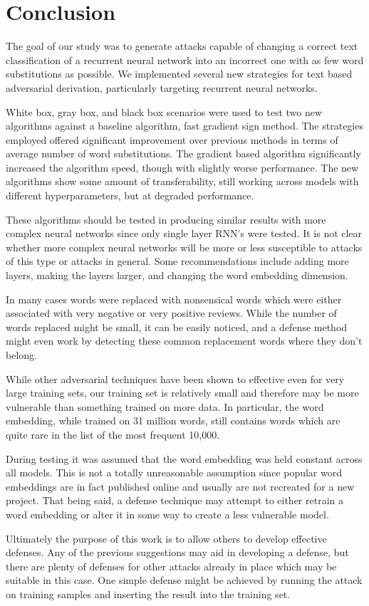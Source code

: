 \chapter{Conclusion}
The goal of our study was to generate attacks capable of changing a correct text classification of a recurrent neural network into an incorrect one with as few word substitutions as possible.  We implemented several new strategies for text based adversarial derivation, particularly targeting recurrent neural networks.  

White box, gray box, and black box scenarios were used to test two new algorithms against a baseline algorithm, fast gradient sign method.  The strategies employed offered significant improvement over previous methods in terms of average number of word substitutions.  The gradient based algorithm significantly increased the algorithm speed, though with slightly worse performance.  The new algorithms show some amount of transferability, still working across models with different hyperparameters, but at degraded performance.  

These algorithms should be tested in producing similar results with more complex neural networks since only single layer RNN's were tested.  It is not clear whether more complex neural networks will be more or less susceptible to attacks of this type or attacks in general.  Some recommendations include adding more layers, making the layers larger, and changing the word embedding dimension.

In many cases words were replaced with nonsensical words which were either associated with very negative or very positive reviews.  While the number of words replaced might be small, it can be easily noticed, and a defense method might even work by detecting these common replacement words where they don't belong.

While other adversarial techniques have been shown to effective even for very large training sets, our training set is relatively small and therefore may be more vulnerable than something trained on more data.  In particular, the word embedding, while trained on 31 million words, still contains words which are quite rare in the list of the most frequent 10,000.

During testing it was assumed that the word embedding was held constant across all models.  This is not a totally unreasonable assumption since popular word embeddings are in fact published online and usually are not recreated for a new project.  That being said, a defense technique may attempt to either retrain a word embedding or alter it in some way to create a less vulnerable model.

Ultimately the purpose of this work is to allow others to develop effective defenses.  Any of the previous suggestions may aid in developing a defense, but there are plenty of defenses for other attacks already in place which may be suitable in this case.  One simple defense might be achieved by running the attack on training samples and inserting the result into the training set.
